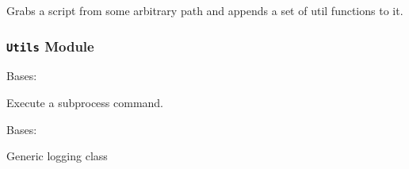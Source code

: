 \documentclass[a4paper,11pt,openany]{sphinxmanual}
\begin{document}

\begin{fulllineitems}
\label{ref-manual/XrdTest:XrdTest.TestUtils.resolveScript}
Grabs a script from some arbitrary path and appends a set of util functions
to it.

\end{fulllineitems}



\subsubsection{\texttt{Utils} Module}
\label{ref-manual/XrdTest:module-XrdTest.Utils}\label{ref-manual/XrdTest:utils-module}

\begin{fulllineitems}
\label{ref-manual/XrdTest:XrdTest.Utils.Command}
Bases: 

Execute a subprocess command.

\begin{fulllineitems}
\label{ref-manual/XrdTest:XrdTest.Utils.Command.execute}
\end{fulllineitems}


\end{fulllineitems}


\begin{fulllineitems}
\label{ref-manual/XrdTest:XrdTest.Utils.Logger}
Bases: 

Generic logging class

\begin{fulllineitems}
\label{ref-manual/XrdTest:XrdTest.Utils.Logger.setup}
\end{fulllineitems}


\end{fulllineitems}
\end{document}
